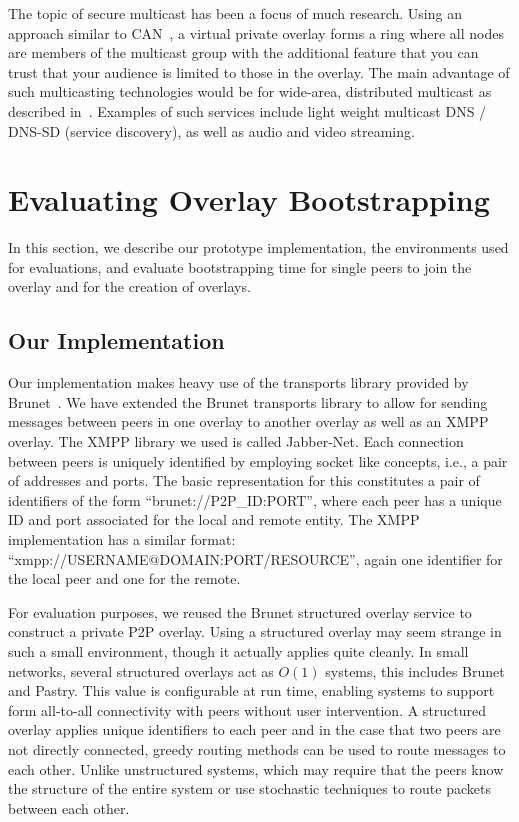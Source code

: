 \documentclass[conference]{IEEEtran}
\begin{document}
The topic of secure multicast has been a focus of much research.  Using an
approach similar to CAN~\cite{can_multicast}, a virtual private overlay forms a
ring where all nodes are members of the multicast group with the additional
feature that you can trust that your audience is limited to those in the
overlay.  The main advantage of such multicasting technologies would be for
wide-area, distributed multicast as described in~\cite{from_peer}.  Examples of
such services include light weight multicast DNS / DNS-SD (service discovery),
as well as audio and video streaming.

\section{Evaluating Overlay Bootstrapping}
\label{evaluations}
In this section, we describe our prototype implementation, the environments
used for evaluations, and evaluate bootstrapping time for single peers to
join the overlay and for the creation of overlays.

\subsection{Our Implementation}

Our implementation makes heavy use of the transports library provided by
Brunet~\cite{brunet}.  We have extended the Brunet transports library to allow
for sending messages between peers in one overlay to another overlay as well as
an XMPP overlay.  The XMPP library we used is called Jabber-Net.  Each
connection between peers is uniquely identified by employing socket like
concepts, i.e., a pair of addresses and ports.  The basic representation for
this constitutes a pair of identifiers of the form ``brunet://P2P\_ID:PORT'',
where each peer has a unique ID and port associated for the local and remote
entity.  The XMPP implementation has a similar format:
``xmpp://USERNAME@DOMAIN:PORT/RESOURCE'', again one identifier for the local
peer and one for the remote.

For evaluation purposes, we reused the Brunet structured overlay service to
construct a private P2P overlay.  Using a structured overlay may seem strange
in such a small environment, though it actually applies quite cleanly.  In
small networks, several structured overlays act as $O(1)$ systems, this
includes Brunet and Pastry.  This value is configurable at run time, enabling
systems to support form all-to-all connectivity with peers without user
intervention.  A structured overlay applies unique identifiers to each peer and
in the case that two peers are not directly connected, greedy routing methods
can be used to route messages to each other.  Unlike unstructured systems,
which may require that the peers know the structure of the entire system or use
stochastic techniques to route packets between each other.
\end{document}
